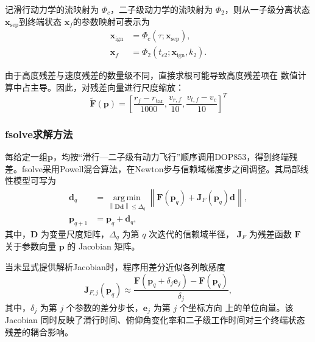 \documentclass{JXUSTmodeling}
\begin{document}
记滑行动力学的流映射为 $\Phi_c$，二子级动力学的流映射为
$\Phi_2$，则从一子级分离状态$\mathbf{x}_{\mathrm{sep}}$到终端状态 $\mathbf{x}_f$的参数映射可表示为
\begin{equation}
	\begin{aligned}
		\mathbf{x}_{\mathrm{ign}}
		&=
		\Phi_c
		\left(\tau;\mathbf{x}_{\mathrm{sep}}\right), \\
		\mathbf{x}_f
		&=
		\Phi_2
		\left(
		t_{c2};
		\mathbf{x}_{\mathrm{ign}},k_2
		\right).
	\end{aligned}
	\label{eq:state_flow_mapping}
\end{equation}

由于高度残差与速度残差的数量级不同，直接求根可能导致高度残差项在
数值计算中占主导。因此，对残差向量进行尺度缩放：
\begin{equation}
	\widetilde{\mathbf{F}}(\mathbf{p})
	=
	\left[
	\dfrac{r_f-r_{\mathrm{tar}}}{1000},
	\dfrac{v_{r,f}}{10},
	\dfrac{v_{t,f}-v_c}{10}
	\right]^T
	\label{eq:scaled_shooting_residual}
\end{equation}

\subsubsection{fsolve求解方法}
每给定一组$\mathbf{p}$，均按“滑行—二子级有动力飞行”顺序调用DOP853，得到终端残差。fsolve采用Powell混合算法，在Newton步与信赖域梯度步之间调整。其局部线性模型可写为
\begin{equation}
	\begin{aligned}
		\mathbf{d}_q
		&=
		\underset{
			\left\lVert\mathbf{D}\mathbf{d}\right\rVert
			\leq\Delta_q
		}{
			\operatorname{arg\,min}
		}
		\left\lVert
		\mathbf{F}(\mathbf{p}_q)
		+
		\mathbf{J}_{F}(\mathbf{p}_q)\mathbf{d}
		\right\rVert, \\
		\mathbf{p}_{q+1}
		&=
		\mathbf{p}_q+\mathbf{d}_q,
	\end{aligned}
	\label{eq:powell_hybrid}
\end{equation}
其中，$\mathbf{D}$ 为变量尺度矩阵，$\Delta_q$ 为第 $q$ 次迭代的信赖域半径，
$\mathbf{J}_{F}$ 为残差函数 $\mathbf{F}$ 关于参数向量 $\mathbf{p}$ 的 Jacobian
矩阵。

当未显式提供解析Jacobian时，程序用差分近似各列敏感度
\begin{equation}
	\mathbf{J}_{F,j}(\mathbf{p}_q)
	\approx
	\frac{
		\mathbf{F}\left(
		\mathbf{p}_q+\delta_j\mathbf{e}_j
		\right)
		-
		\mathbf{F}(\mathbf{p}_q)
	}{
		\delta_j
	},
	\label{eq:finite_difference_jacobian}
\end{equation}
其中，$\delta_j$ 为第 $j$ 个参数的差分步长，$\mathbf{e}_j$ 为第 $j$ 个坐标方向
上的单位向量。该 Jacobian 同时反映了滑行时间、俯仰角变化率和二子级工作时间对三个终端状态残差的耦合影响。
\end{document}
